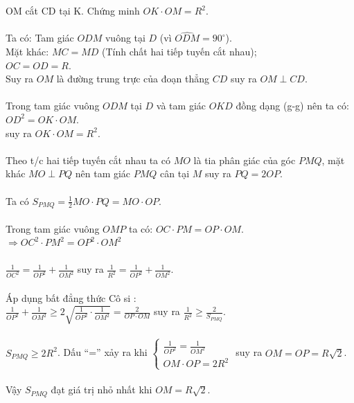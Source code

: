 \begin{ex}
{\begin{center}
			
		\end{center}
		
		OM cắt CD tại K. Chứng minh $OK \cdot OM = R^2$. \\
		\\
		Ta có: Tam giác $ODM$ vuông tại $D$ (vì $\widehat{ODM} = 90^\circ$). \\
		Mặt khác: $MC = MD$ (Tính chất hai tiếp tuyến cắt nhau); \\
		$OC = OD = R$. \\
		Suy ra $OM$ là đường trung trực của đoạn thẳng $CD$ suy ra $OM \perp CD$. \\
		\\
		Trong tam giác vuông $ODM$ tại $D$ và tam giác $OKD$ đồng dạng (g-g) nên ta có: \\
		$OD^2 = OK \cdot OM$. \\
		suy ra $OK \cdot OM = R^2$. \\
		\\
		Theo t/c hai tiếp tuyến cắt nhau ta có $MO$ là tia phân giác của góc $PMQ$, mặt \\
		khác $MO \perp PQ$ nên tam giác $PMQ$ cân tại $M$ suy ra $PQ = 2OP$. \\
		\\
		Ta có $S_{PMQ} = \frac{1}{2} MO \cdot PQ = MO \cdot OP$. \\
		\\
		Trong tam giác vuông $OMP$ ta có: $OC \cdot PM = OP \cdot OM$. \\
		$\Rightarrow OC^2 \cdot PM^2 = OP^2 \cdot OM^2$ \\
		\\
		$\frac{1}{OC^2} = \frac{1}{OP^2} + \frac{1}{OM^2}$ suy ra $\frac{1}{R^2} = \frac{1}{OP^2} + \frac{1}{OM^2}$. \\
		\\
		Áp dụng bất đẳng thức Cô si : \\
		$\frac{1}{OP^2} + \frac{1}{OM^2} \ge 2 \sqrt{\frac{1}{OP^2} \cdot \frac{1}{OM^2}} = \frac{2}{OP \cdot OM}$ suy ra $\frac{1}{R^2} \ge \frac{2}{S_{PMQ}}$. \\
		\\
		$S_{PMQ} \ge 2R^2$. Dấu “=” xảy ra khi
		$\begin{cases}
			\frac{1}{OP^2} = \frac{1}{OM^2} \\
			OM \cdot OP = 2R^2
		\end{cases}$
		suy ra $OM = OP = R\sqrt{2}$. \\
		\\
		Vậy $S_{PMQ}$ đạt giá trị nhỏ nhất khi $OM = R\sqrt{2}$.
	}
	
	
\end{ex}

